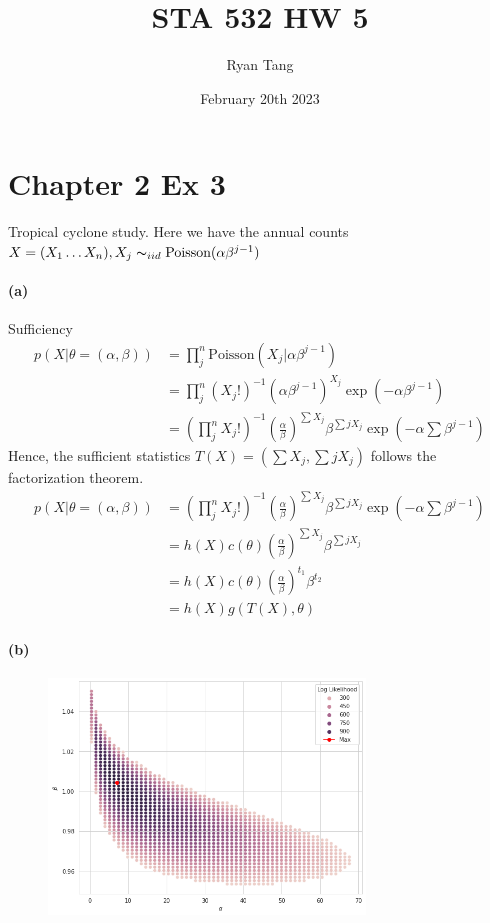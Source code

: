 \documentclass[11pt, letterpaper]{article}
\author{Ryan Tang}
\title{STA 532 HW 5}
\date{February 20th 2023}
\begin{document}
\maketitle

\section{Chapter 2 Ex 3}
Tropical cyclone study. Here we have the annual counts $X = (X_1 \dots X_n), X_j \thicksim_{iid} \text{Poisson}(\alpha\beta^{j-1})$
\paragraph{(a)} Sufficiency
\begin{align*}
    p(X|\theta=(\alpha, \beta)) &= \prod_j^n \text{Poisson}(X_j|\alpha \beta^{j-1}) \\
        &= \prod_j^n (X_j!)^{-1} (\alpha\beta^{j-1})^{X_j} \exp(-\alpha\beta^{j-1}) \\
        &= (\prod_j^n X_j!)^{-1} (\frac{\alpha}{\beta})^{\sum X_j} \beta^{\sum jX_j} \exp(-\alpha \sum \beta^{j-1})
\end{align*}
Hence, the sufficient statistics $T(X) = (\sum X_j, \sum jX_j)$ follows the factorization theorem.
\begin{align*}
    p(X|\theta=(\alpha, \beta))
        &= (\prod_j^n X_j!)^{-1} (\frac{\alpha}{\beta})^{\sum X_j} \beta^{\sum jX_j} \exp(-\alpha \sum \beta^{j-1}) \\
        &= h(X) c(\theta) (\frac{\alpha}{\beta})^{\sum X_j} \beta^{\sum jX_j} \\
        &= h(X) c(\theta) (\frac{\alpha}{\beta})^{t_1} \beta^{t_2} \\
        &= h(X) g(T(X), \theta)
\end{align*}

\paragraph{(b)}
\begin{figure}[!h]
  \centering
  \includegraphics[width=0.75\textwidth]{hw5-1.png}
  \captionsetup{justification=centering}
  \caption{}
\end{figure}
\end{document}
